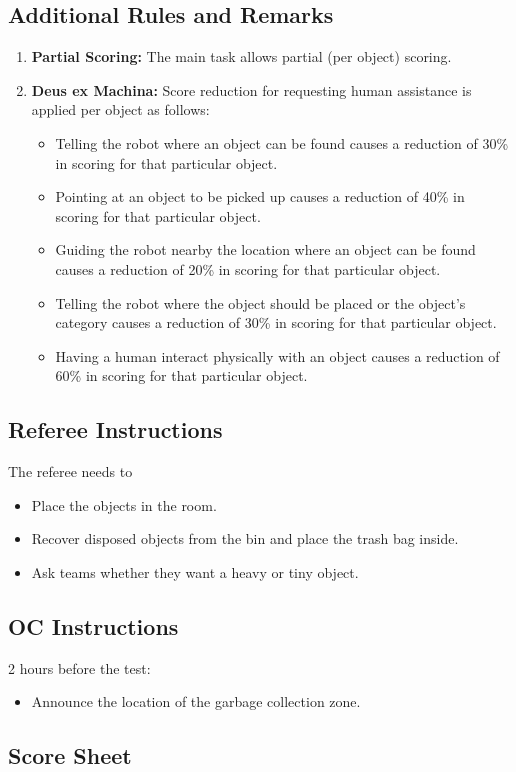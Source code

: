 \subsection*{Additional Rules and Remarks}
\begin{enumerate}[nosep]
	\item \textbf{Partial Scoring:} The main task allows partial (per object) scoring.
	
	\item \textbf{Deus ex Machina:} Score reduction for requesting human assistance is applied per object as follows:
	\begin{itemize}[nosep]
		\item Telling the robot where an object can be found causes a reduction of 30\% in scoring for that particular object.
		
		\item Pointing at an object to be picked up causes a reduction of 40\% in scoring for that particular object.
		
		\item Guiding the robot nearby the location where an object can be found causes a reduction of 20\% in scoring for that particular object.
		
		\item Telling the robot where the object should be placed or the object's category causes a reduction of 30\% in scoring for that particular object.
		
		\item Having a human interact physically with an object causes a reduction of 60\% in scoring for that particular object.
	\end{itemize}
\end{enumerate}

\subsection*{Referee Instructions}
The referee needs to
\begin{itemize}
	\item Place the objects in the room.
	\item Recover disposed objects from the bin and place the trash bag inside.
	\item Ask teams whether they want a heavy or tiny object.
\end{itemize}

\subsection*{OC Instructions}
2 hours before the test:
\begin{itemize}
	\item Announce the location of the garbage collection zone.
\end{itemize}

\subsection*{Score Sheet}


